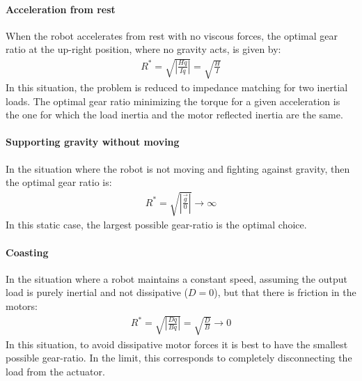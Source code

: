 \paragraph{Acceleration from rest} 

When the robot accelerates from rest with no viscous forces, the optimal gear ratio at the up-right position, where no gravity acts, is given by:
\begin{align}
	R^{*}  = \sqrt{ \left | \frac{H \ddot{q} }{ I \ddot{q} } \right |   } = \sqrt{ \frac{H}{I}}
 \label{eq:impmatching}
\end{align}
In this situation, the problem is reduced to impedance matching for two inertial loads. The optimal gear ratio minimizing the torque for a given acceleration is the one for which the load inertia and the motor reflected inertia are the same.

\paragraph{Supporting gravity without moving}

In the situation where the robot is not moving and fighting against gravity, then the optimal gear ratio is:
\begin{align}
	R^{*}  = \sqrt{ \left | \frac{ \vec{g} }{ 0 } \right |   } \rightarrow \infty
 \label{eq:gravrejection}
\end{align}
In this static case, the largest possible gear-ratio is the optimal choice. 


\paragraph{Coasting} 

In the situation where a robot maintains a constant speed, assuming the output load is purely inertial and not dissipative ($D=0$), but that there is friction in the motors:
%
\begin{align}
	R^{*}  = \sqrt{ \left | \frac{D \dot{q} }{ B \dot{q} } \right |   } = \sqrt{ \frac{D}{B}} \rightarrow 0
 \label{eq:impmatching}
\end{align}
%
In this situation, to avoid dissipative motor forces it is best to have the smallest possible gear-ratio. In the limit, this corresponds to completely disconnecting the load from the actuator.



